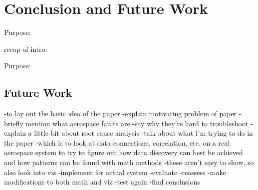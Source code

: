 \chapter{Conclusion and Future Work}

Purpose:

recap of intro:

Purpose:

\section{}









\section{Future Work}


-to lay out the basic idea of the paper
-explain motivating problem of paper
-briefly mention what aerospace faults are
-say why they're hard to troubleshoot
-explain a little bit about root cause analysis
-talk about what I'm trying to do in the paper
-which is to look at data connections, correlation, etc. on a real aerospace system to try to figure out how data discovery can best be achieved and how patterns can be found with math methods
-these aren't easy to show, so also look into viz
-implement for actual system
-evaluate
-reassess
-make modifications to both math and viz
-test again
-find conclusions

